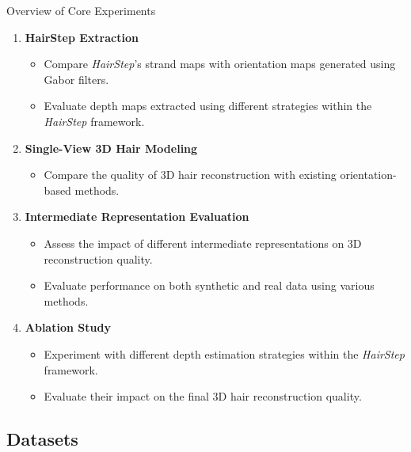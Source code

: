 \begin{frame}[t]{Overview of Core Experiments}
    \begin{enumerate}
        \item \textbf{HairStep Extraction}
        \begin{itemize}
            \item Compare \emph{HairStep}'s strand maps with orientation maps generated using Gabor filters.
            \item Evaluate depth maps extracted using different strategies within the \emph{HairStep} framework.
        \end{itemize}

        \item \textbf{Single-View 3D Hair Modeling}
        \begin{itemize}
            \item Compare the quality of 3D hair reconstruction with existing orientation-based methods.
        \end{itemize}

        \item \textbf{Intermediate Representation Evaluation}
        \begin{itemize}
            \item Assess the impact of different intermediate representations on 3D reconstruction quality.
            \item Evaluate performance on both synthetic and real data using various methods.
        \end{itemize}

        \item \textbf{Ablation Study}
        \begin{itemize}
            \item Experiment with different depth estimation strategies within the \emph{HairStep} framework.
            \item Evaluate their impact on the final 3D hair reconstruction quality.
        \end{itemize}
    \end{enumerate}
\end{frame}

\subsection{Datasets}

